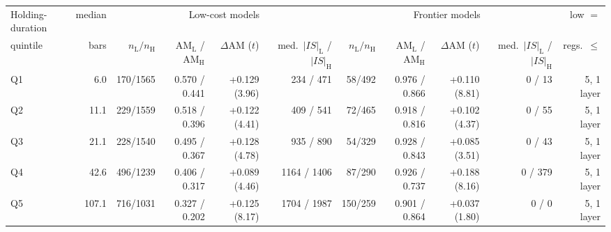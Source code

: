 \begin{tabular}{lrrrrrrrrrr}
\toprule
Holding-duration & median & \multicolumn{4}{c}{Low-cost models} & \multicolumn{4}{c}{Frontier models} & low $=$ \\
\cmidrule(lr){3-6}\cmidrule(lr){7-10}
quintile & bars & $n_{\mathrm{L}}/n_{\mathrm{H}}$ & AM$_{\mathrm{L}}$ / AM$_{\mathrm{H}}$ & $\Delta$AM ($t$) & med.\ $|IS|_{\mathrm{L}}$ / $|IS|_{\mathrm{H}}$ & $n_{\mathrm{L}}/n_{\mathrm{H}}$ & AM$_{\mathrm{L}}$ / AM$_{\mathrm{H}}$ & $\Delta$AM ($t$) & med.\ $|IS|_{\mathrm{L}}$ / $|IS|_{\mathrm{H}}$ & regs.\ $\le$ \\
\midrule
Q1 & 6.0 & 170/1565 & 0.570 / 0.441 & +0.129 (3.96) & 234 / 471 & 58/492 & 0.976 / 0.866 & +0.110 (8.81) & 0 / 13 & 5, 1 layer \\
Q2 & 11.1 & 229/1559 & 0.518 / 0.396 & +0.122 (4.41) & 409 / 541 & 72/465 & 0.918 / 0.816 & +0.102 (4.37) & 0 / 55 & 5, 1 layer \\
Q3 & 21.1 & 228/1540 & 0.495 / 0.367 & +0.128 (4.78) & 935 / 890 & 54/329 & 0.928 / 0.843 & +0.085 (3.51) & 0 / 43 & 5, 1 layer \\
Q4 & 42.6 & 496/1239 & 0.406 / 0.317 & +0.089 (4.46) & 1164 / 1406 & 87/290 & 0.926 / 0.737 & +0.188 (8.16) & 0 / 379 & 5, 1 layer \\
Q5 & 107.1 & 716/1031 & 0.327 / 0.202 & +0.125 (8.17) & 1704 / 1987 & 150/259 & 0.901 / 0.864 & +0.037 (1.80) & 0 / 0 & 5, 1 layer \\
\bottomrule
\end{tabular}
